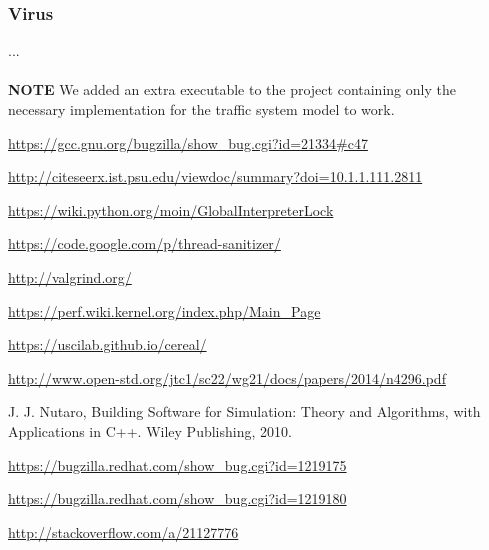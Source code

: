 \documentclass[8pt,a4paper]{report}
\begin{document}
\subsubsection{Virus}
...\\
\\
\textbf{NOTE} We added an extra executable to the project containing only the necessary implementation for the traffic system model to work.


\begin{thebibliography}{1}


   \url{https://gcc.gnu.org/bugzilla/show_bug.cgi?id=21334#c47}

   \url{http://citeseerx.ist.psu.edu/viewdoc/summary?doi=10.1.1.111.2811}
  
   \url{https://wiki.python.org/moin/GlobalInterpreterLock}
  
   \url{https://code.google.com/p/thread-sanitizer/}
  
   \url{http://valgrind.org/}
  
   \url{https://perf.wiki.kernel.org/index.php/Main_Page}
  
   \url{https://uscilab.github.io/cereal/}
  
   \url{http://www.open-std.org/jtc1/sc22/wg21/docs/papers/2014/n4296.pdf}
  
    J. J. Nutaro, Building Software for Simulation: Theory and Algorithms, with
Applications in C++. Wiley Publishing, 2010.

    \url{https://bugzilla.redhat.com/show_bug.cgi?id=1219175}
  
    \url{https://bugzilla.redhat.com/show_bug.cgi?id=1219180}

   \url{http://stackoverflow.com/a/21127776}

  \end{thebibliography}
\end{document}
